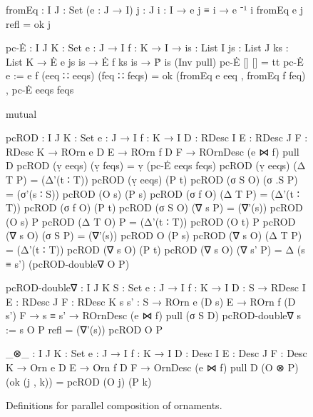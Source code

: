 \begin{figure}
\codefigure\small{}\baselineskip
\begin{code}
fromEq : {I J : Set} (e : J → I) {j : J} {i : I} → e j ≡ i → e ⁻¹ i
fromEq e {j} refl = ok j

pc-Ė :  {I J K : Set} {e : J → I} {f : K → I} →
        {is : List I} {js : List J} {ks : List K} →
        Ė e js is → Ė f ks is → Ṗ is (Inv pull)
pc-Ė               []            []            =  tt
pc-Ė {e := e} {f}  (eeq ∷ eeqs)  (feq ∷ feqs)  =  ok (fromEq e eeq , fromEq f feq) ,
                                                  pc-Ė eeqs feqs

mutual

  pcROD :  {I J K : Set} {e : J → I} {f : K → I}
           {D : RDesc I} {E : RDesc J} {F : RDesc K} →
           ROrn e D E → ROrn f D F → ROrnDesc (e ⋈ f) pull D
  pcROD (ṿ eeqs)    (ṿ feqs)  = ṿ (pc-Ė eeqs feqs)
  pcROD (ṿ eeqs)    (Δ T P)   = (Δ'(t ∶ T))  pcROD (ṿ eeqs)  (P t)
  pcROD (σ S O)     (σ .S P)  = (σ'(s ∶ S))  pcROD (O s)    (P s)
  pcROD (σ f O)     (Δ T P)   = (Δ'(t ∶ T))  pcROD (σ f O)  (P t)
  pcROD (σ S O)     (∇ s P)   = (∇'(s))      pcROD (O s)    P
  pcROD (Δ T O)     P         = (Δ'(t ∶ T))  pcROD (O t)    P
  pcROD (∇ s O)     (σ S P)   = (∇'(s))      pcROD O        (P s)
  pcROD (∇ s O)     (Δ T P)   = (Δ'(t ∶ T))  pcROD (∇ s O)  (P t)
  pcROD (∇ s O)     (∇ s' P)  = Δ (s ≡ s') (pcROD-double∇ O P)

  pcROD-double∇ :
    {I J K S : Set} {e : J → I} {f : K → I}
    {D : S → RDesc I} {E : RDesc J} {F : RDesc K} {s s' : S} →
    ROrn e (D s) E → ROrn f (D s') F →
    s ≡ s' → ROrnDesc (e ⋈ f) pull (σ S D)
  pcROD-double∇ {s := s} O P refl = (∇'(s)) pcROD O P

_⊗_ :  {I J K : Set} {e : J → I} {f : K → I}
       {D : Desc I} {E : Desc J} {F : Desc K} →
       Orn e D E → Orn f D F → OrnDesc (e ⋈ f) pull D
(O ⊗ P) (ok (j , k)) = pcROD (O j) (P k)
\end{code}
\caption{Definitions for parallel composition of ornaments.}
\label{fig:parallel-composition}
\end{figure}


